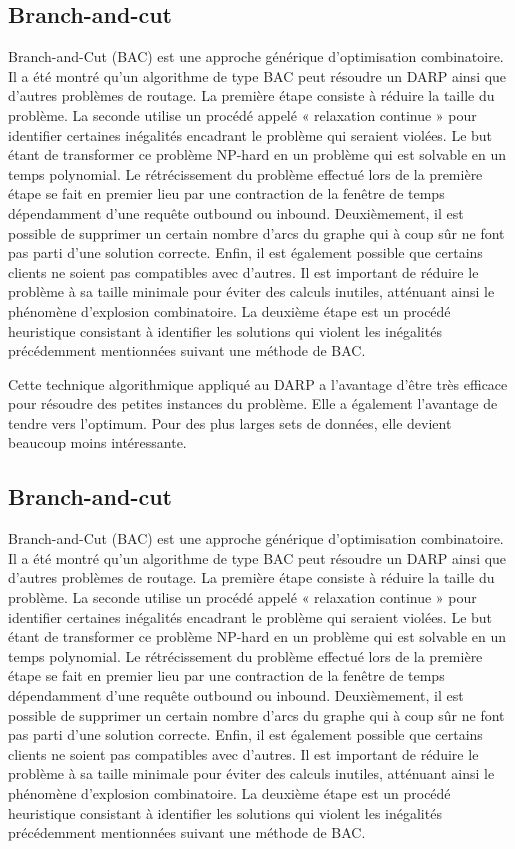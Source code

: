 \documentclass[10pt,a4paper]{report}
\begin{document}
\subsection*{Branch-and-cut}
Branch-and-Cut (BAC) est une approche générique d'optimisation combinatoire. Il a été montré qu'un algorithme de type BAC peut résoudre un DARP ainsi que d'autres problèmes de routage. 
La première étape consiste à réduire la taille du problème. La seconde utilise un procédé appelé « relaxation continue » pour identifier certaines inégalités encadrant le problème qui seraient violées. Le but étant de transformer ce problème NP-hard en un problème qui est solvable en un temps polynomial. 
Le rétrécissement du problème effectué lors de la première étape se fait en premier lieu par une contraction de la fenêtre de temps dépendamment d'une requête outbound ou inbound. Deuxièmement, il est possible de supprimer un certain nombre d'arcs du graphe qui à coup sûr ne font pas parti d'une solution correcte. Enfin, il est également possible que certains clients ne soient pas compatibles avec d'autres. Il est important de réduire le problème à sa taille minimale pour éviter des calculs inutiles, atténuant ainsi le phénomène d'explosion combinatoire. 
La deuxième étape est un procédé heuristique consistant à identifier les solutions qui violent les inégalités précédemment mentionnées suivant une méthode de BAC. 

Cette technique algorithmique appliqué au DARP a l'avantage d'être très efficace pour résoudre des petites instances du problème. Elle a également l'avantage de tendre vers l'optimum. Pour des plus larges sets de données, elle devient beaucoup moins intéressante. 

\subsection*{Branch-and-cut}
Branch-and-Cut (BAC) est une approche générique d'optimisation combinatoire. Il a été montré qu'un algorithme de type BAC peut résoudre un DARP ainsi que d'autres problèmes de routage. 
La première étape consiste à réduire la taille du problème. La seconde utilise un procédé appelé « relaxation continue » pour identifier certaines inégalités encadrant le problème qui seraient violées. Le but étant de transformer ce problème NP-hard en un problème qui est solvable en un temps polynomial. 
Le rétrécissement du problème effectué lors de la première étape se fait en premier lieu par une contraction de la fenêtre de temps dépendamment d'une requête outbound ou inbound. Deuxièmement, il est possible de supprimer un certain nombre d'arcs du graphe qui à coup sûr ne font pas parti d'une solution correcte. Enfin, il est également possible que certains clients ne soient pas compatibles avec d'autres. Il est important de réduire le problème à sa taille minimale pour éviter des calculs inutiles, atténuant ainsi le phénomène d'explosion combinatoire. 
La deuxième étape est un procédé heuristique consistant à identifier les solutions qui violent les inégalités précédemment mentionnées suivant une méthode de BAC. 
\end{document}
